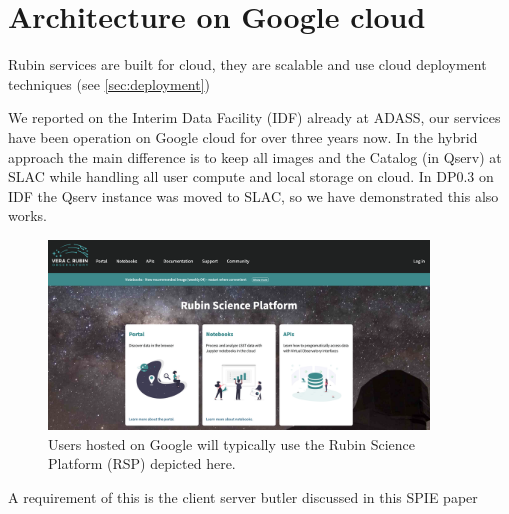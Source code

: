\section{Architecture on Google cloud} \label{sec:google}

Rubin services are built for cloud, they are scalable and use cloud deployment techniques (see \autoref{sec:deployment})

We reported on the Interim Data Facility (IDF) already at ADASS\cite{2021arXiv211115030O}, our services  have been operation on Google cloud for over three years now.
In the hybrid approach the main difference is to keep all images  and the Catalog (in Qserv) at SLAC while handling all user compute and local storage on
cloud.
In DP0.3 on IDF the Qserv instance was moved to SLAC, so we have demonstrated this also works.



\begin{figure}
\begin{centering}
\includegraphics[width=0.9\textwidth]{RSP.png}
	\caption{ Users hosted on Google will typically use the Rubin Science Platform (RSP) depicted here.  \label{fig:goglearch}}
\end{centering}
\end{figure}


A requirement of this is the client server butler discussed  in this SPIE paper \cite{2024SPIE13101.129Jtmp}
